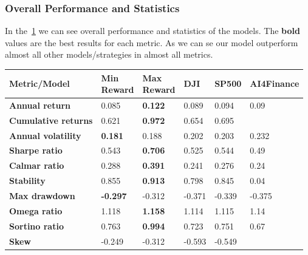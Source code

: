 \documentclass[../xlapes02]{subfiles}
\begin{document}
    \newpage

    \subsubsection{Overall Performance and Statistics}
    In the~\cref{tab:performance} we can see overall performance and statistics of the models. The \textbf{bold} values are the best results for each metric. As we can se our model outperform almost all other models/strategies in almost all metrics.
    \begin{table}[!ht]
        \centering
        \label{tab:performance}
        \begin{tabular}{|l|l|l|l|l|l|}
            \hline
            \textbf{Metric/Model} & \makecell{\textbf{Min} \\ \textbf{Reward}}       & \makecell{\textbf{Max}           \\ \textbf{Reward}}  & \textbf{DJI}           & \textbf{SP500} & \textbf{AI4Finance}  \\ \hline
            \textbf{Annual return}   & 0.085  & \textbf{0.122}          & 0.089  & 0.094  & 0.09  \\ \hline
            \textbf{Cumulative returns}        & 0.621           & \textbf{0.972} & 0.654  & 0.695  & ~   \\ \hline
            \textbf{Annual volatility}        & \textbf{0.181}           & 0.188 & 0.202  & 0.203  & 0.232   \\ \hline
            \textbf{Sharpe ratio}           & 0.543           & \textbf{0.706} & 0.525  & 0.544  & 0.49   \\ \hline
            \textbf{Calmar ratio}        & 0.288 & \textbf{0.391}         & 0.241 & 0.276 & 0.24 \\ \hline
            \textbf{Stability}         & 0.855           & \textbf{0.913} & 0.798  & 0.845  & 0.04   \\ \hline
            \textbf{Max drawdown}       & \textbf{-0.297}           & -0.312 & -0.371  & -0.339  & -0.375   \\ \hline
            \textbf{Omega ratio}                & 1.118          & \textbf{1.158}         & 1.114 & 1.115 & 1.14      \\ \hline
            \textbf{Sortino ratio}            & 0.763          & \textbf{0.994}         & 0.723  & 0.751 & 0.67      \\ \hline
            \textbf{Skew}          & -0.249           & -0.312          & -0.593  & -0.549  & ~   \\ \hline

\end{tabular}
\end{table}
\end{document}

